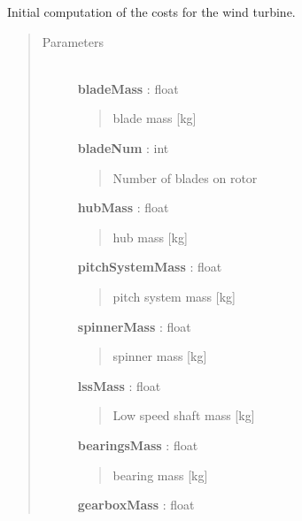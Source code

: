 \documentclass[letterpaper,10pt,openany,oneside]{sphinxmanual}
\begin{document}
\begin{fulllineitems}
\label{documentation:turbine_costSE.src.turbine_costSE.TurbineCost}
Initial computation of the costs for the wind turbine.
\begin{quote}\begin{description}
\item[{Parameters }] \leavevmode\\
\textbf{bladeMass} : float
\begin{quote}

blade mass {[}kg{]}
\end{quote}

\textbf{bladeNum} : int
\begin{quote}

Number of blades on rotor
\end{quote}

\textbf{hubMass} : float
\begin{quote}

hub mass {[}kg{]}
\end{quote}

\textbf{pitchSystemMass} : float
\begin{quote}

pitch system mass {[}kg{]}
\end{quote}

\textbf{spinnerMass} : float
\begin{quote}

spinner mass {[}kg{]}
\end{quote}

\textbf{lssMass} : float
\begin{quote}

Low speed shaft mass {[}kg{]}
\end{quote}

\textbf{bearingsMass} : float
\begin{quote}

bearing mass {[}kg{]}
\end{quote}

\textbf{gearboxMass} : float
\begin{quote}


\end{quote}
\end{description}
\end{quote}
\end{fulllineitems}
\end{document}

